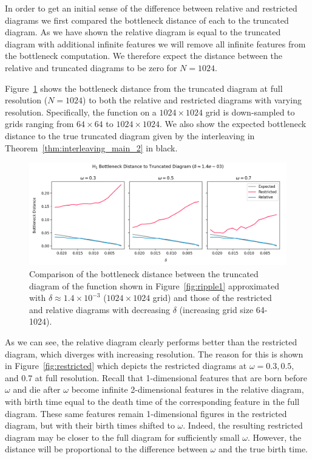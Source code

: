 In order to get an initial sense of the difference between relative and restricted diagrams we first compared the bottleneck distance of each to the truncated diagram.
As we have shown the relative diagram is equal to the truncated diagram with additional infinite features we will remove all infinite features from the bottleneck computation.
We therefore expect the distance between the relative and truncated diagrams to be zero for $N=1024$.

Figure~\ref{fig:bottleneck} shows the bottleneck distance from the truncated diagram at full resolution ($N = 1024$) to both the relative and restricted diagrams with varying resolution.
Specifically, the function on a $1024\times 1024$ grid is down-sampled to grids ranging from $64\times 64$ to $1024\times 1024$.
We also show the expected bottleneck distance to the true truncated diagram given by the interleaving in Theorem~\ref{thm:interleaving_main_2} in black.

\begin{figure}[htbp]\label{fig:bottleneck}
  \centering
  \includegraphics[width=\textwidth]{scripts/figures/matching2/bottleneck_delta.png}
  \caption{Comparison of the bottleneck distance between the truncated diagram of the function shown in Figure~\ref{fig:ripple1} approximated with $\delta\approx 1.4\times10^{-3}$ ($1024\times 1024$ grid) and those of the restricted and relative diagrams with decreasing $\delta$ (increasing grid size 64-1024).}
\end{figure}


As we can see, the relative diagram clearly performs better than the restricted diagram, which diverges with increasing resolution.
The reason for this is shown in Figure~\ref{fig:restricted} which depicts the restricted diagrams at $\omega = 0.3, 0.5,$ and $0.7$ at full resolution.
Recall that 1-dimensional features that are born before $\omega$ and die after $\omega$ become infinite 2-dimensional features in the relative diagram, with birth time equal to the death time of the corresponding feature in the full diagram.
These same features remain 1-dimensional figures in the restricted diagram, but with their birth times shifted to $\omega$.
Indeed, the resulting restricted diagram may be closer to the full diagram for sufficiently small $\omega$.
However, the distance will be proportional to the difference between $\omega$ and the true birth time.

